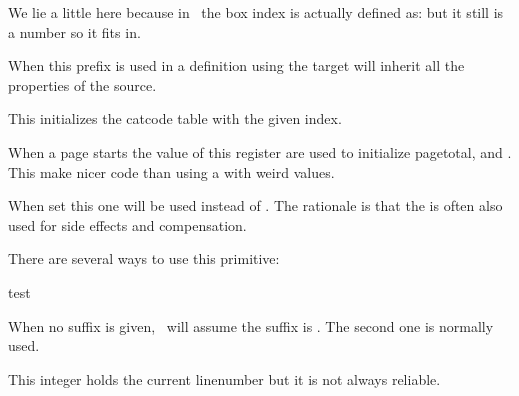 \typebuffer


We lie a little here because in \CONTEXT\ the box index  is
actually defined as: \expanded {\typ {\meaningasis \scratchbox}} but it
still is a number so it fits in.

\getbuffer

\stopnewprimitive

\startnewprimitive[title={\prm {inherited}}]

When this prefix is used in a definition using  the target will inherit
all the properties of the source.

\stopnewprimitive

\startnewprimitive[title={\prm {initcatcodetable}}]

This initializes the catcode table with the given index.

\stopnewprimitive

\startnewprimitive[title={\prm {initialpageskip}}]

When a page starts the value of this register are used to initialize \prm
{pagetotal},  and . This make nicer code than
using a  with weird values.

\stopnewprimitive

\startnewprimitive[title={\prm {initialtopskip}}]

When set this one will be used instead of . The rationale is that
the  is often also used for side effects and compensation.

\stopnewprimitive

\startoldprimitive[title={\prm {input}}]

There are several ways to use this primitive:

\starttyping

 {test}


\stoptyping

When no suffix is given, \TEX\ will assume the suffix is . The second
one is normally used.

\stopoldprimitive

\startoldprimitive[title={\prm {inputlineno}}]

This integer holds the current linenumber but it is not always reliable.

